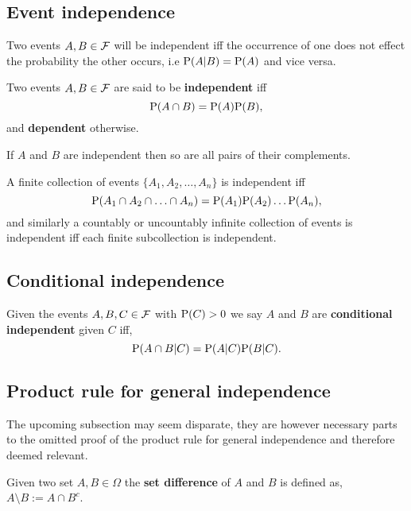 \documentclass[../Year1/Year1.tex]{subfiles}
\begin{document}
\subsection{Event independence}
Two events $A,B\in\FFF$ will be independent iff the occurrence of one does not effect the probability the other occurs, i.e $\P(A|B) = \P(A)$ and vice versa.

\begin{definition}
    Two events $A,B \in \FFF$ are said to be \textbf{independent} iff\[
    \P(A\cap B) = \P(A)\P(B) \textcolor{black}{,}
    \] and \textbf{dependent} otherwise.
\end{definition}

\begin{corollary}
    If $A$ and $B$ are independent then so are all pairs of their complements.
\end{corollary}

\begin{definition}
    A finite collection of events $\{A_1,A_2,\ldots ,A_n\}$ is independent iff \[
    \P(A_1\cap A_2\cap \ldots \cap A_n) = \P(A_1)\P(A_2)\ldots \P(A_n)\textcolor{black}{,}
    \]
    and similarly a countably or uncountably infinite collection of events is independent iff each finite subcollection is independent.
\end{definition}

\subsection{Conditional independence}

\begingroup\belowdisplayskip=-20pt
\begin{definition}
    Given the events $A,B,C \in \FFF$ with $\P(C)>0$ we say $A$ and $B$ are \textbf{conditional independent} given $C$ iff, \[
        \P(A\cap B|C) = \P(A|C)\P(B|C) \textcolor{black}{.}
    \]
\end{definition}
\endgroup

\subsection{Product rule for general independence}
The upcoming subsection may seem disparate, they are however necessary parts to the omitted proof of the product rule for general independence and therefore deemed relevant.
\begin{definition}
        Given two set $A,B\in\Omega$ the \textbf{set difference} of $A$ and $B$ is defined as, $A\setminus B := A \cap B^c$.
\end{definition}
\end{document}
